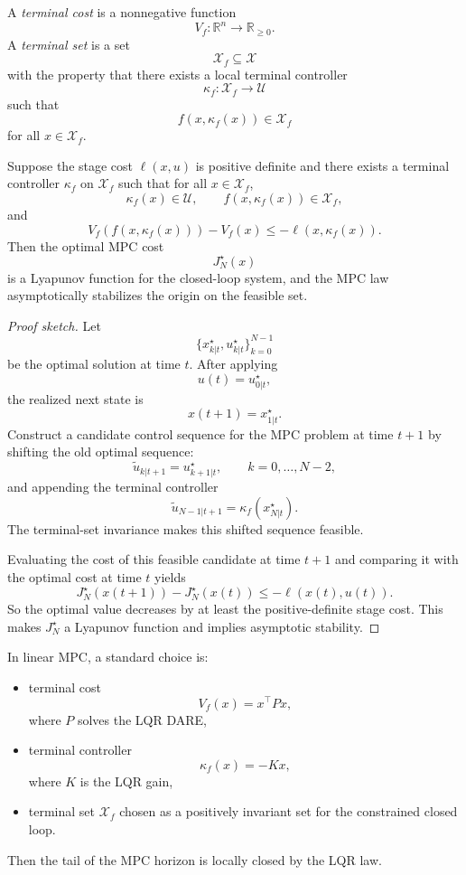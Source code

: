 \begin{definition}\label{def:l9-terminal-cost-and-terminal-set}
	A \emph{terminal cost} is a nonnegative function
	\[
		V_f:\mathbb{R}^n \to \mathbb{R}_{\ge 0}.
	\]
	A \emph{terminal set} is a set
	\[
		\mathcal{X}_f \subseteq \mathcal{X}
	\]
	with the property that there exists a local terminal controller
	\[
		\kappa_f:\mathcal{X}_f \to \mathcal{U}
	\]
	such that
	\[
		f(x,\kappa_f(x)) \in \mathcal{X}_f
	\]
	for all $x \in \mathcal{X}_f$.
\end{definition}

\begin{theorem}\label{thm:l9-stability-of-mpc-via-a-terminal-lyapunov-condition}
	Suppose the stage cost $\ell(x,u)$ is positive definite and there exists a terminal controller $\kappa_f$ on $\mathcal{X}_f$ such that for all $x \in \mathcal{X}_f$,
	\[
		\kappa_f(x)\in \mathcal{U},
		\qquad
		f(x,\kappa_f(x))\in \mathcal{X}_f,
	\]
	and
	\[
		V_f(f(x,\kappa_f(x))) - V_f(x) \le -\ell(x,\kappa_f(x)).
	\]
	Then the optimal MPC cost
	\[
		J_N^\star(x)
	\]
	is a Lyapunov function for the closed-loop system, and the MPC law asymptotically stabilizes the origin on the feasible set.
\end{theorem}
\begin{proof}[Proof sketch]
	Let
	\[
		\{x_{k|t}^\star,u_{k|t}^\star\}_{k=0}^{N-1}
	\]
	be the optimal solution at time $t$. After applying
	\[
		u(t)=u_{0|t}^\star,
	\]
	the realized next state is
	\[
		x(t+1)=x_{1|t}^\star.
	\]
	Construct a candidate control sequence for the MPC problem at time $t+1$ by shifting the old optimal sequence:
	\[
		\tilde u_{k|t+1}=u_{k+1|t}^\star,
		\qquad
		k=0,\dots,N-2,
	\]
	and appending the terminal controller
	\[
		\tilde u_{N-1|t+1}=\kappa_f(x_{N|t}^\star).
	\]
	The terminal-set invariance makes this shifted sequence feasible.

	Evaluating the cost of this feasible candidate at time $t+1$ and comparing it with the optimal cost at time $t$ yields
	\[
		J_N^\star(x(t+1)) - J_N^\star(x(t))
		\le
		-\ell(x(t),u(t)).
	\]
	So the optimal value decreases by at least the positive-definite stage cost. This makes $J_N^\star$ a Lyapunov function and implies asymptotic stability.
\end{proof}

\begin{remark}
	In linear MPC, a standard choice is:
	\begin{itemize}
		\item terminal cost
		      \[
			      V_f(x)=x^\top P x,
		      \]
		      where $P$ solves the LQR DARE,
		\item terminal controller
		      \[
			      \kappa_f(x)=-Kx,
		      \]
		      where $K$ is the LQR gain,
		\item terminal set $\mathcal{X}_f$ chosen as a positively invariant set for the constrained closed loop.
	\end{itemize}
	Then the tail of the MPC horizon is locally closed by the LQR law.
\end{remark}

